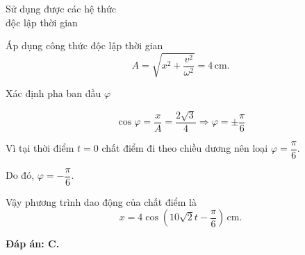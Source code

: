 \begin{dang}{Sử dụng được các hệ thức\\ độc lập thời gian}
{\begin{description}
			Áp dụng công thức độc lập thời gian
			\begin{equation*}
				A=\sqrt{x^2+\dfrac{v^2}{\omega ^2}}=4\,\text{cm}.
			\end{equation*}
			
			\item[Bước 3:] Xác định pha ban đầu $\varphi$
			
			\begin{equation*}
				\cos\varphi =\dfrac{x}{A}=\dfrac{2\sqrt 3}{4}\Rightarrow\varphi =\pm\dfrac{\pi }{6}
			\end{equation*}
			
			Vì tại thời điểm $t=0$ chất điểm đi theo chiều dương nên loại $\varphi =\dfrac{\pi }{6}$.
			
			Do đó, $\varphi =-\dfrac{\pi }{6}$.
		\end{description}
		
		Vậy phương trình dao động của chất điểm là
		\begin{equation*}
			x=4\cos \left(10\sqrt 2 t-\dfrac{\pi }{6} \right)\,\text{cm}.
		\end{equation*}
		
		\textbf{Đáp án: C.}
	}
\end{dang}